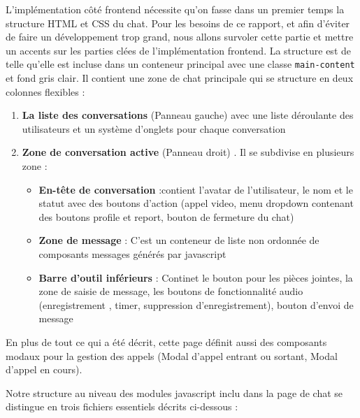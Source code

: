 L'implémentation côté frontend nécessite qu'on fasse dans un premier temps la structure HTML et CSS du chat. Pour les besoins de ce rapport, et afin d'éviter de faire un développement trop grand, nous allons survoler cette partie et mettre un accents sur les parties clées de l'implémentation frontend. La structure est de telle qu'elle est incluse dans un conteneur principal avec une classe \verb|main-content| et fond gris clair. Il contient une zone de chat principale qui se structure en deux colonnes flexibles :

\begin{enumerate}
    \item \textbf{La liste des conversations} (Panneau gauche) avec une liste déroulante des utilisateurs et un système d'onglets pour chaque conversation
    \item \textbf{Zone de conversation active} (Panneau droit) . Il se subdivise en plusieurs zone : 
    \begin{itemize}
        \item \textbf{En-tête de conversation} :contient l'avatar de l'utilisateur, le nom et le statut avec des boutons d'action (appel video, menu dropdown contenant des boutons profile et report, bouton de fermeture du chat)
        \item \textbf{Zone de message} : C'est un conteneur de liste non ordonnée de composants messages générés par javascript
        \item \textbf{Barre d'outil inférieurs} : Continet le bouton pour les pièces jointes, la zone de saisie de message, les boutons de fonctionnalité audio (enregistrement , timer, suppression d'enregistrement),
        bouton d'envoi de message
    \end{itemize}
\end{enumerate}

\vspace{0.35cm}

En plus de tout ce qui a été décrit, cette page définit aussi des composants modaux pour la gestion des appels (Modal d'appel entrant ou sortant, Modal d'appel en cours).

\vspace{0.35cm}

Notre structure au niveau des modules javascript inclu dans la page de chat se distingue en trois fichiers essentiels décrits ci-dessous : 


